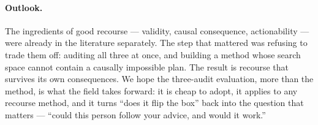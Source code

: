 \paragraph{Outlook.} The ingredients of good recourse --- validity, causal
consequence, actionability --- were already in the literature separately. The step
that mattered was refusing to trade them off: auditing all three at once, and
building a method whose search space cannot contain a causally impossible plan.
The result is recourse that survives its own consequences. We hope the three-audit
evaluation, more than the method, is what the field takes forward: it is cheap to
adopt, it applies to any recourse method, and it turns ``does it flip the box'' back
into the question that matters --- ``could this person follow your advice, and
would it work.''
